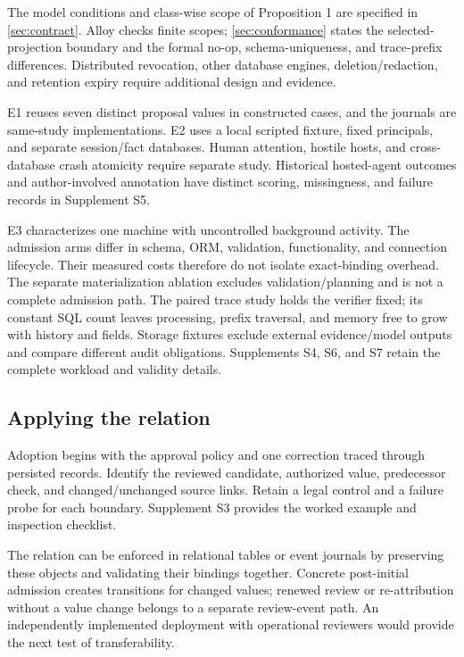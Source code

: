 The model conditions and class-wise scope of Proposition 1 are specified in \cref{sec:contract}. Alloy checks finite scopes; \cref{sec:conformance} states the selected-projection boundary and the formal no-op, schema-uniqueness, and trace-prefix differences. Distributed revocation, other database engines, deletion/redaction, and retention expiry require additional design and evidence.

E1 reuses seven distinct proposal values in constructed cases, and the journals are same-study implementations. E2 uses a local scripted fixture, fixed principals, and separate session/fact databases. Human attention, hostile hosts, and cross-database crash atomicity require separate study. Historical hosted-agent outcomes and author-involved annotation have distinct scoring, missingness, and failure records in Supplement S5.

E3 characterizes one machine with uncontrolled background activity. The admission arms differ in schema, ORM, validation, functionality, and connection lifecycle. Their measured costs therefore do not isolate exact-binding overhead. The separate materialization ablation excludes validation/planning and is not a complete admission path. The paired trace study holds the verifier fixed; its constant SQL count leaves processing, prefix traversal, and memory free to grow with history and fields. Storage fixtures exclude external evidence/model outputs and compare different audit obligations. Supplements S4, S6, and S7 retain the complete workload and validity details.

\subsection{Applying the relation}

Adoption begins with the approval policy and one correction traced through persisted records. Identify the reviewed candidate, authorized value, predecessor check, and changed/unchanged source links. Retain a legal control and a failure probe for each boundary. Supplement S3 provides the worked example and inspection checklist.

The relation can be enforced in relational tables or event journals by preserving these objects and validating their bindings together. Concrete post-initial admission creates transitions for changed values; renewed review or re-attribution without a value change belongs to a separate review-event path. An independently implemented deployment with operational reviewers would provide the next test of transferability.
